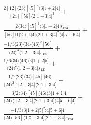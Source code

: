 \documentclass[varwidth, border=5pt]{standalone}
\begin{document}
\begin{my}
$\begin{gathered}
\scriptscriptstyle\frac{2[12]⟨23⟩[45]^2⟨3|1+2|4]}{[24][56]⟨2|1+3|4]^3}+\\
\scriptscriptstyle\frac{2⟨34⟩[45]^2⟨3|1+2|4]s_{123}}{[56]⟨1|2+3|4]⟨2|1+3|4]^2⟨4|5+6|4]}+\\
\scriptscriptstyle\frac{-1/3⟨23⟩⟨34⟩⟨46⟩^2[56]}{⟨24⟩^3⟨1|2+3|4]s_{123}}+\\
\scriptscriptstyle\frac{1/6⟨34⟩⟨46⟩⟨3|1+2|5]}{⟨24⟩^2⟨1|2+3|4]s_{123}}+\\
\scriptscriptstyle\frac{1/2⟨23⟩⟨34⟩[45]⟨46⟩}{⟨24⟩^2⟨1|2+3|4]⟨2|1+3|4]}+\\
\scriptscriptstyle\frac{3/2⟨34⟩[45]⟨46⟩⟨3|1+2|4]}{⟨24⟩⟨1|2+3|4]⟨2|1+3|4]⟨4|5+6|4]}+\\
\scriptscriptstyle\frac{-1/3⟨3|1+2|5]^2⟨4|5+6|4]}{⟨24⟩[56]⟨1|2+3|4]⟨2|1+3|4]s_{123}}\phantom{+}
\end{gathered}$
\end{my}
\end{document}

